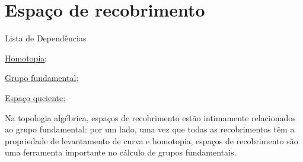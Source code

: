 \section{Espaço de recobrimento}
\label{espaco-de-recobrimento}

\begin{titlemize}{Lista de Dependências}
	\item \hyperref[homotopia]{Homotopia};\\ %
	\item \hyperref[grupo-fundamental]{Grupo fundamental};\\
    \item \hyperref[topologia-quociente]{Espaço quciente};
\end{titlemize}

Na topologia algébrica, espaços de recobrimento estão intimamente relacionados ao grupo fundamental: por um lado, uma vez que todas as recobrimentos têm a propriedade de levantamento de curva e homotopia, espaços de recobrimento são uma ferramenta importante no cálculo de grupos fundamentais.



